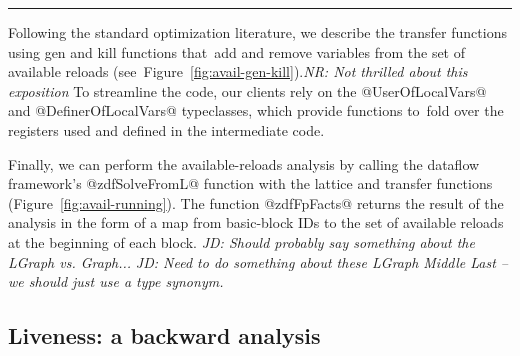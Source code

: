 \documentclass[blockstyle,preprint,nocopyrightspace]{sigplanconf}
\newcommand{\authornote}[1]{{\em #1}}
\newcommand{\norman}[1]{\authornote{NR: #1}}
\let\remark\norman
\newcommand{\john}[1]{\authornote{JD: #1}}
\newcommand\figref[1]{Figure~\ref{fig:#1}}
\begin{document}
\hrule

Following the standard optimization literature,
we describe the transfer functions using
gen and kill functions that~add and remove variables from the set of available reloads
(see~\figref{avail-gen-kill}).\remark{Not thrilled about this exposition}
To streamline the code, our clients rely on
the @UserOfLocalVars@ and @DefinerOfLocalVars@ typeclasses,
which provide functions to~fold over the registers used and defined
in the intermediate code.


Finally, we can perform the available-reloads analysis by calling
the dataflow framework's @zdfSolveFromL@ function
with the lattice and transfer functions
(\figref{avail-running}).
The function @zdfFpFacts@ returns the result of the analysis
in the form of a map from basic-block IDs to the set of available reloads
at the beginning of each block.
\john{Should probably say something about the LGraph vs. Graph...}
\john{Need to do something about these LGraph Middle Last -- we should
  just use a type synonym.}






\subsection{Liveness: a backward analysis} 
\end{document}

